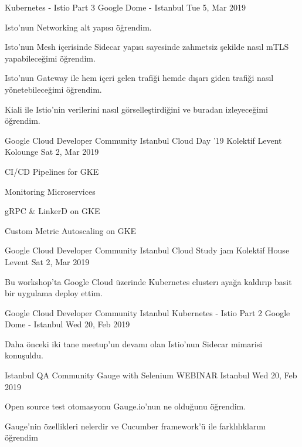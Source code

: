 \begin{cventries}
    {Kubernetes - Istio Part 3}
    {Google Dome - Istanbul}
    {Tue 5, Mar 2019}
    {
      \begin{cvitems}
        \item{Isto'nun Networking alt yapısı öğrendim.}
        \item{Isto'nun Mesh içerisinde Sidecar yapısı sayesinde zahmetsiz şekilde nasıl mTLS yapabileceğimi öğrendim.}
        \item{Isto'nun Gateway ile hem içeri gelen trafiği hemde dışarı giden trafiği nasıl yönetebileceğimi öğrendim.}
        \item{Kiali ile Istio'nin verilerini nasıl görselleştirdiğini ve buradan izleyeceğimi öğrendim.}
      \end{cvitems}
    }
    \cventry
    {Google Cloud Developer Community Istanbul}
    {Cloud Day '19}
    {Kolektif Levent Kolounge}
    {Sat 2, Mar 2019}
    {
      \begin{cvitems}
        \item{CI/CD Pipelines for GKE}
        \item{Monitoring Microservices}
        \item{gRPC \& LinkerD on GKE}
        \item{Custom Metric Autoscaling on GKE}
      \end{cvitems}
    }
    \cventry
    {Google Cloud Developer Community Istanbul}
    {Cloud Study jam}
    {Kolektif House Levent}
    {Sat 2, Mar 2019}
    {
      \begin{cvitems}
        \item{Bu workshop'ta Google Cloud üzerinde Kubernetes clusterı ayağa kaldırıp basit bir uygulama deploy ettim.}
      \end{cvitems}
    }
    \cventry
    {Google Cloud Developer Community Istanbul}
    {Kubernetes - Istio Part 2}
    {Google Dome - Istanbul}
    {Wed 20, Feb 2019}
    {
      \begin{cvitems}
        \item{Daha önceki iki tane meetup'un devamı olan Istio'nun Sidecar mimarisi konuşuldu.}
      \end{cvitems}
    }
    \cventry
    {Istanbul QA Community}
    {Gauge with Selenium WEBINAR}
    {Istanbul}
    {Wed 20, Feb 2019}
    {
      \begin{cvitems}
        \item{Open source test otomasyonu Gauge.io'nun ne olduğunu öğrendim.}
        \item{Gauge'nin özellikleri nelerdir ve Cucumber framework'ü ile farklılıklarını öğrendim}

\end{cvitems}}
\end{cventries}
